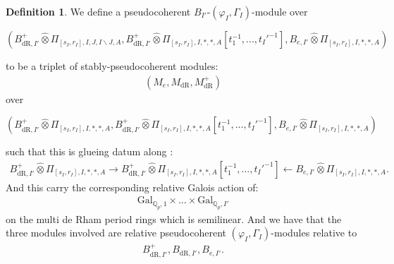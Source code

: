 \documentclass[12pt]{amsart}
\theoremstyle{definition}
\newtheorem{definition}[theorem]{Definition}
\numberwithin{equation}{section}
\begin{document}
\begin{definition}
We define a pseudocoherent $B_{I'}$-$(\varphi_I,\Gamma_I)$-module over
\begin{center}
$(B^+_{\mathrm{dR},I'}	\widehat{\otimes}\Pi_{[s_I,r_I],I,J,I\backslash J,A},B^+_{\mathrm{dR},I'}	\widehat{\otimes}\Pi_{[s_I,r_I],I,*,*,A}[t_1^{-1},...,t_I'^{-1}],B_{e,I'}	\widehat{\otimes}\Pi_{[s_I,r_I],I,*,*,A})$	
\end{center}
to be a triplet of stably-pseudocoherent modules:
\begin{align}
(M_e,M_{\mathrm{dR}},M^+_{\mathrm{dR}})	
\end{align}
over 
\begin{center}
$(B^+_{\mathrm{dR},I'}	\widehat{\otimes}\Pi_{[s_I,r_I],I,*,*,A},B^+_{\mathrm{dR},I'}	\widehat{\otimes}\Pi_{[s_I,r_I],I,*,*,A}[t_1^{-1},...,t_I'^{-1}],B_{e,I'}	\widehat{\otimes}\Pi_{[s_I,r_I],I,*,*,A})$	
\end{center}
such that this is glueing datum along :
\begin{align}
B^+_{\mathrm{dR},I'}	\widehat{\otimes}\Pi_{[s_I,r_I],I,*,*,A}\rightarrow B^+_{\mathrm{dR},I'}	\widehat{\otimes}\Pi_{[s_I,r_I],I,*,*,A}[t_1^{-1},...,t_I'^{-1}] \leftarrow B_{e,I'}	\widehat{\otimes}\Pi_{[s_I,r_I],I,*,*,A}.	
\end{align}
And this carry the corresponding relative Galois action of:
\begin{align}
\mathrm{Gal}_{\mathbb{Q}_p,1}\times...\times \mathrm{Gal}_{\mathbb{Q}_p,I'}		
\end{align}
on the multi de Rham period rings which is semilinear. And we have that the three modules involved are relative pseudocoherent $(\varphi_I,\Gamma_I)$-modules relative to
\begin{align}
B^+_{\mathrm{dR},I'},B_{\mathrm{dR},I'},B_{e,I'}.	
\end{align}

	
\end{definition}
\end{document}
